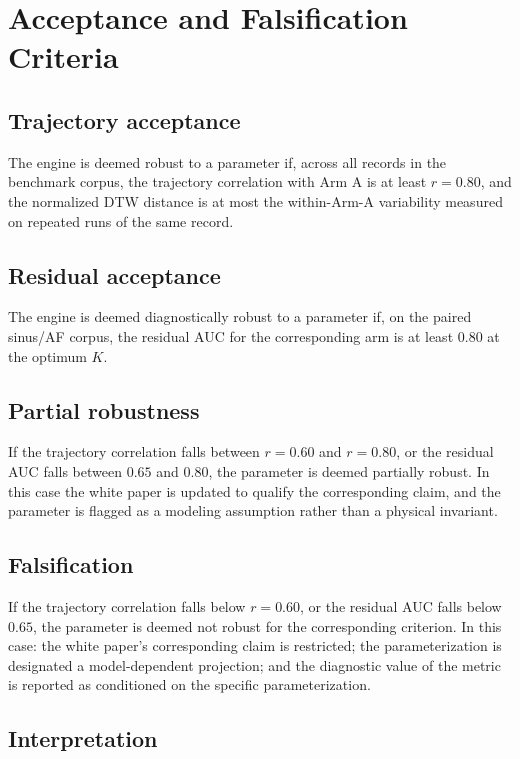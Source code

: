 \documentclass[11pt]{article}
\begin{document}
\section{Acceptance and Falsification Criteria}

\subsection{Trajectory acceptance}

The engine is deemed robust to a parameter if, across all records in the
benchmark corpus, the trajectory correlation with Arm A is at least
$r = 0.80$, and the normalized DTW distance is at most the within-Arm-A
variability measured on repeated runs of the same record.

\subsection{Residual acceptance}

The engine is deemed diagnostically robust to a parameter if, on the
paired sinus/AF corpus, the residual AUC for the corresponding arm is
at least $0.80$ at the optimum $K$.

\subsection{Partial robustness}

If the trajectory correlation falls between $r = 0.60$ and $r = 0.80$,
or the residual AUC falls between $0.65$ and $0.80$, the parameter is
deemed partially robust. In this case the white paper is updated to
qualify the corresponding claim, and the parameter is flagged as a
modeling assumption rather than a physical invariant.

\subsection{Falsification}

If the trajectory correlation falls below $r = 0.60$, or the residual
AUC falls below $0.65$, the parameter is deemed not robust for the
corresponding criterion. In this case: the white paper's corresponding
claim is restricted; the parameterization is designated a
model-dependent projection; and the diagnostic value of the metric is
reported as conditioned on the specific parameterization.

\subsection{Interpretation}
\end{document}
